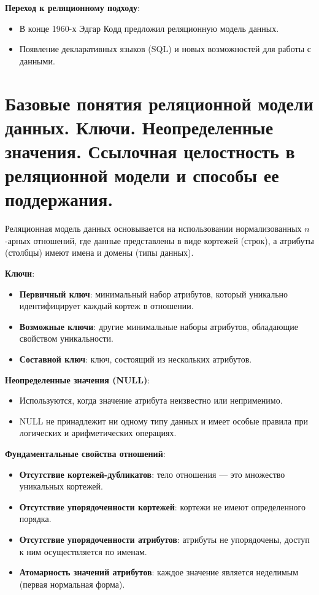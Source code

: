 \documentclass[a4paper,12pt]{article}
\begin{document}
\textbf{Переход к реляционному подходу}:

\begin{itemize}
    \item В конце 1960-х Эдгар Кодд предложил реляционную модель данных.
    \item Появление декларативных языков (SQL) и новых возможностей для работы с данными.
\end{itemize}

\section{Базовые понятия реляционной модели данных. Ключи. Неопределенные значения. Ссылочная целостность в реляционной модели и способы ее поддержания.}

Реляционная модель данных основывается на использовании нормализованных $n$-арных отношений, где данные представлены в виде кортежей (строк), а атрибуты (столбцы) имеют имена и домены (типы данных).

\textbf{Ключи}:

\begin{itemize}
    \item \textbf{Первичный ключ}: минимальный набор атрибутов, который уникально идентифицирует каждый кортеж в отношении.
    \item \textbf{Возможные ключи}: другие минимальные наборы атрибутов, обладающие свойством уникальности.
    \item \textbf{Составной ключ}: ключ, состоящий из нескольких атрибутов.
\end{itemize}

\textbf{Неопределенные значения (NULL)}:

\begin{itemize}
    \item Используются, когда значение атрибута неизвестно или неприменимо.
    \item NULL не принадлежит ни одному типу данных и имеет особые правила при логических и арифметических операциях.
\end{itemize}

\textbf{Фундаментальные свойства отношений}:

\begin{itemize}
    \item \textbf{Отсутствие кортежей-дубликатов}: тело отношения — это множество уникальных кортежей.
    \item \textbf{Отсутствие упорядоченности кортежей}: кортежи не имеют определенного порядка.
    \item \textbf{Отсутствие упорядоченности атрибутов}: атрибуты не упорядочены, доступ к ним осуществляется по именам.
    \item \textbf{Атомарность значений атрибутов}: каждое значение является неделимым (первая нормальная форма).
\end{itemize}
\end{document}
